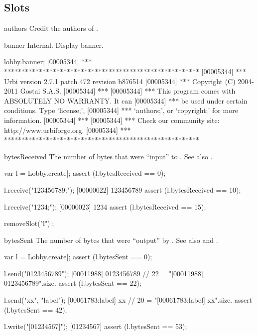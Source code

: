\subsection{Slots}
\begin{urbiscriptapi}
\item[authors] Credit the authors of \usdk.

\item[banner] Internal.  Display \usdk banner.
\begin{urbiscript}
lobby.banner;
[00005344] *** ********************************************************
[00005344] *** Urbi version 2.7.1 patch 472 revision b876514
[00005344] *** Copyright (C) 2004-2011 Gostai S.A.S.
[00005344] ***
[00005344] *** This program comes with ABSOLUTELY NO WARRANTY.  It can
[00005344] *** be used under certain conditions.  Type `license;',
[00005344] *** `authors;', or `copyright;' for more information.
[00005344] ***
[00005344] *** Check our community site: http://www.urbiforge.org.
[00005344] *** ********************************************************
\end{urbiscript}

\item[bytesReceived] The number of bytes that were ``input'' to \this.  See
  also .
\begin{urbiscript}
var l = Lobby.create|;
assert (l.bytesReceived == 0);

l.receive("123456789;");
[00000022] 123456789
assert (l.bytesReceived == 10);

l.receive("1234;");
[00000023] 1234
assert (l.bytesReceived == 15);
\end{urbiscript}

\begin{urbicomment}
removeSlot("l")|;
\end{urbicomment}

\item[bytesSent] The number of bytes that were ``output'' by \this.  See
  also  and .
\begin{urbiscript}
var l = Lobby.create|;
assert (l.bytesSent == 0);

l.send("0123456789");
[00011988] 0123456789
// 22 = "[00011988] 0123456789\n".size.
assert (l.bytesSent == 22);

l.send("xx", "label");
[00061783:label] xx
// 20 = "[00061783:label] xx\n".size.
assert (l.bytesSent == 42);

l.write("[01234567]\n");
[01234567]
assert (l.bytesSent == 53);
\end{urbiscript}


\end{urbiscriptapi}
